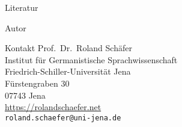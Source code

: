 \documentclass[handout,aspectratio=1610,dvipsnames]{beamer}
\begin{document}
%

\fi

\makeatletter
\setcounter{lastpagemainpart}{\the\c@framenumber}
\makeatother

\appendix

\begin{frame}[allowframebreaks]
  {Literatur}
  \renewcommand*{\bibfont}{\footnotesize}
  \printbibliography
\end{frame}

\begin{frame}
  {Autor}
  \begin{block}{Kontakt}
    Prof.\ Dr.\ Roland Schäfer\\
    Institut für Germanistische Sprachwissenschaft\\
    Friedrich-Schiller-Universität Jena\\
    Fürstengraben 30\\
    07743 Jena\\[\baselineskip]
    \url{https://rolandschaefer.net}\\
    \texttt{roland.schaefer@uni-jena.de}
  \end{block}
\end{frame}
\end{document}
